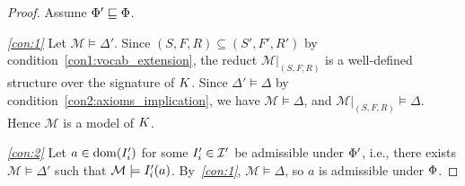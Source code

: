 \begin{proof}
Assume $\Phi' \sqsubseteq \Phi$.

\noindent\textit{\eqref{con:1}} Let $\mathcal{M} \models \Delta'$. Since 
$(S, F, R) \subseteq (S', F', R')$ by 
condition~\ref{con1:vocab_extension}, the reduct 
$\mathcal{M}|_{(S,F,R)}$ is a well-defined structure over the 
signature of $K$. Since $\Delta' \models \Delta$ by 
condition~\ref{con2:axioms_implication}, we have $\mathcal{M} 
\models \Delta$, and $\mathcal{M}|_{(S,F,R)} \models 
\Delta$. Hence $\mathcal{M}$ is a model of $K$.

\noindent\textit{\eqref{con:2}} Let $a \in \mathrm{dom}(I'_i)$ 
for some $I'_i \in \mathcal{I}'$ be admissible 
under $\Phi'$, i.e., there exists $\mathcal{M} \models 
\Delta'$ such that $\mathcal{M} \models I'_i(a)$. 
By~\textit{\eqref{con:1}}, $\mathcal{M} \models \Delta$, so $a$ is admissible 
under $\Phi$.
\end{proof}




%





